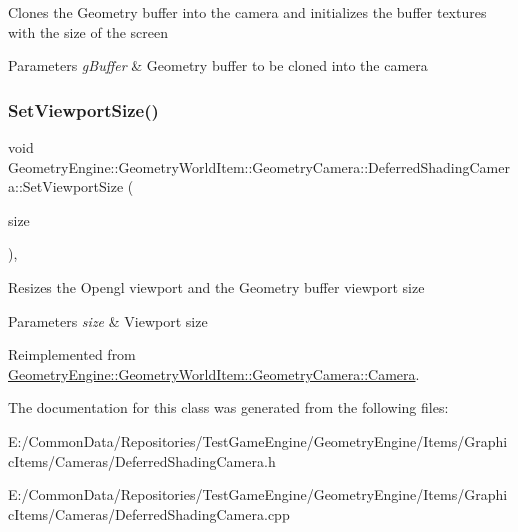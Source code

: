 Clones the Geometry buffer into the camera and initializes the buffer textures with the size of the screen 
\begin{DoxyParams}{Parameters}
{\em g\+Buffer} & Geometry buffer to be cloned into the camera \\
\hline
\end{DoxyParams}
\mbox{\label{class_geometry_engine_1_1_geometry_world_item_1_1_geometry_camera_1_1_deferred_shading_camera_a16da38cfd723b755a63c372c08bbedf7}} 
\subsubsection{\texorpdfstring{SetViewportSize()}{SetViewportSize()}}
{\footnotesize\ttfamily void Geometry\+Engine\+::\+Geometry\+World\+Item\+::\+Geometry\+Camera\+::\+Deferred\+Shading\+Camera\+::\+Set\+Viewport\+Size (\begin{DoxyParamCaption}\item[{const Q\+Vector4D \&}]{size }\end{DoxyParamCaption})\hspace{0.3cm}{\ttfamily [override]}, {\ttfamily [virtual]}}

Resizes the Opengl viewport and the Geometry buffer viewport size 
\begin{DoxyParams}{Parameters}
{\em size} & Viewport size \\
\hline
\end{DoxyParams}


Reimplemented from \mbox{\hyperlink{class_geometry_engine_1_1_geometry_world_item_1_1_geometry_camera_1_1_camera_a96954629a05eba955adc1dff2df1fbdb}{Geometry\+Engine\+::\+Geometry\+World\+Item\+::\+Geometry\+Camera\+::\+Camera}}.



The documentation for this class was generated from the following files\+:\begin{DoxyCompactItemize}
\item 
E\+:/\+Common\+Data/\+Repositories/\+Test\+Game\+Engine/\+Geometry\+Engine/\+Items/\+Graphic\+Items/\+Cameras/Deferred\+Shading\+Camera.\+h\item 
E\+:/\+Common\+Data/\+Repositories/\+Test\+Game\+Engine/\+Geometry\+Engine/\+Items/\+Graphic\+Items/\+Cameras/Deferred\+Shading\+Camera.\+cpp\end{DoxyCompactItemize}
